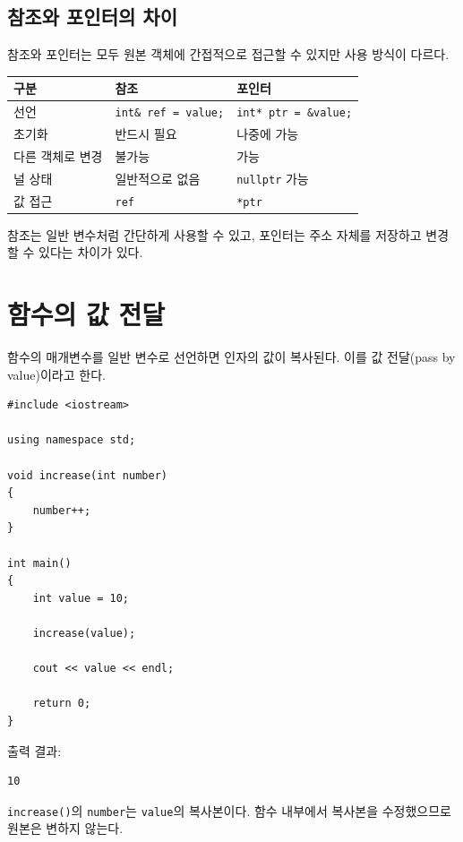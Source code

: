 \documentclass[11pt,a4paper]{article}
\begin{document}
\subsection{참조와 포인터의 차이}

참조와 포인터는 모두 원본 객체에 간접적으로 접근할 수 있지만 사용 방식이 다르다.

\begin{center}
\begin{tabular}{lll}
\toprule
구분 & 참조 & 포인터 \\
\midrule
선언 & \texttt{int\& ref = value;} & \texttt{int* ptr = \&value;} \\
초기화 & 반드시 필요 & 나중에 가능 \\
다른 객체로 변경 & 불가능 & 가능 \\
널 상태 & 일반적으로 없음 & \texttt{nullptr} 가능 \\
값 접근 & \texttt{ref} & \texttt{*ptr} \\
\bottomrule
\end{tabular}
\end{center}

참조는 일반 변수처럼 간단하게 사용할 수 있고, 포인터는 주소 자체를 저장하고 변경할 수 있다는 차이가 있다.

\section{함수의 값 전달}

함수의 매개변수를 일반 변수로 선언하면 인자의 값이 복사된다.
이를 값 전달(pass by value)이라고 한다.

\begin{lstlisting}
#include <iostream>

using namespace std;

void increase(int number)
{
    number++;
}

int main()
{
    int value = 10;

    increase(value);

    cout << value << endl;

    return 0;
}
\end{lstlisting}

출력 결과:

\begin{verbatim}
10
\end{verbatim}

\texttt{increase()}의 \texttt{number}는 \texttt{value}의 복사본이다.
함수 내부에서 복사본을 수정했으므로 원본은 변하지 않는다.
\end{document}
